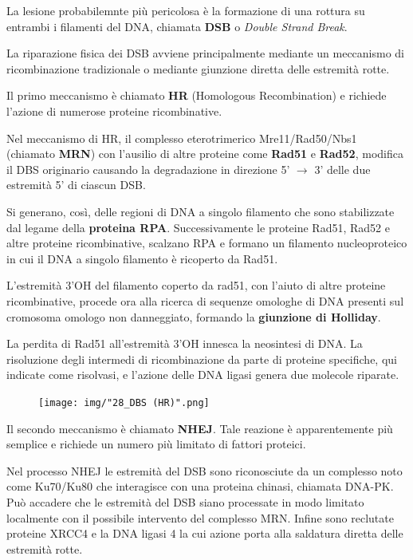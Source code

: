 \documentclass[11pt]{book}
\begin{document}
La lesione probabilemnte più pericolosa è la formazione di una rottura
su entrambi i filamenti del DNA, chiamata \textbf{DSB} o \emph{Double
Strand Break}.

La riparazione fisica dei DSB avviene principalmente mediante un
meccanismo di ricombinazione tradizionale o mediante giunzione diretta
delle estremità rotte.

Il primo meccanismo è chiamato \textbf{HR} (Homologous Recombination) e
richiede l'azione di numerose proteine ricombinative.

Nel meccanismo di HR, il complesso eterotrimerico Mre11/Rad50/Nbs1
(chiamato \textbf{MRN}) con l'ausilio di altre proteine come
\textbf{Rad51} e \textbf{Rad52}, modifica il DBS originario causando la
degradazione in direzione 5' \(\rightarrow\) 3' delle due estremità 5'
di ciascun DSB.

Si generano, così, delle regioni di DNA a singolo filamento che sono
stabilizzate dal legame della \textbf{proteina RPA}. Successivamente le
proteine Rad51, Rad52 e altre proteine ricombinative, scalzano RPA e
formano un filamento nucleoproteico in cui il DNA a singolo filamento è
ricoperto da Rad51.

L'estremità 3'OH del filamento coperto da rad51, con l'aiuto di altre
proteine ricombinative, procede ora alla ricerca di sequenze omologhe di
DNA presenti sul cromosoma omologo non danneggiato, formando la
\textbf{giunzione di Holliday}.

La perdita di Rad51 all'estremità 3'OH innesca la neosintesi di DNA. La
risoluzione degli intermedi di ricombinazione da parte di proteine
specifiche, qui indicate come risolvasi, e l'azione delle DNA ligasi
genera due molecole riparate.

\clearpage
\begin{figure}[htp]
\centering
\texttt{[image: img/"28\_DBS (HR)".png]}
\caption{}
\label{dbs-hr}
\end{figure}

Il secondo meccanismo è chiamato \textbf{NHEJ}. Tale reazione è
apparentemente più semplice e richiede un numero più limitato di fattori
proteici.

Nel processo NHEJ le estremità del DSB sono riconosciute da un complesso
noto come Ku70/Ku80 che interagisce con una proteina chinasi, chiamata
DNA-PK. Può accadere che le estremità del DSB siano processate in modo
limitato localmente con il possibile intervento del complesso MRN.
Infine sono reclutate proteine XRCC4 e la DNA ligasi 4 la cui azione
porta alla saldatura diretta delle estremità rotte.
\end{document}
